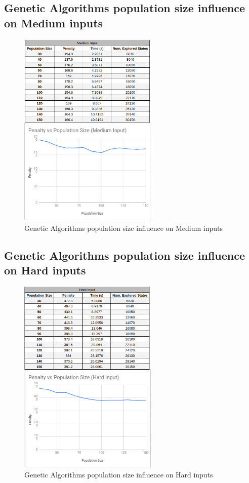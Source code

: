 \documentclass[conference]{IEEEtran}
\begin{document}
\subsection{Genetic Algorithms population size influence on Medium inputs}

\begin{figure}[H]
    \centerline{\includegraphics[width=250px]{genetic_pop_size_medium.png}}
    \caption{Genetic Algorithms population size influence on Medium inputs}
\end{figure}

\subsection{Genetic Algorithms population size influence on Hard inputs}

\begin{figure}[H]
    \centerline{\includegraphics[width=250px]{genetic_pop_size_hard.png}}
    \caption{Genetic Algorithms population size influence on Hard inputs}
\end{figure}
\end{document}
